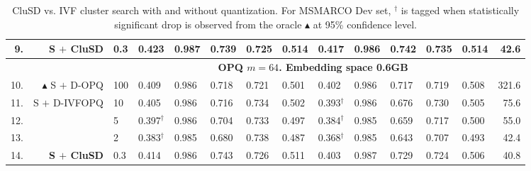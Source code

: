 \begin{table*}[htbp]
{\begin{tabular}{ r r l |l l ll l |llll l|r}
           9. &   \textbf{S $+$ CluSD}  &0.3& 0.423 & 0.987 & 0.739& 0.725 &0.514 & 0.417& 0.986& 0.742&0.735& 0.514  & 42.6  \\
             \hline
           & & & \multicolumn{10}{c}{\bf{OPQ $m=64$. Embedding space 0.6GB}}\\
            \hline
           10. & $\blacktriangle$  S $+$ D-OPQ  &100 & 0.409 & 0.986 & 0.718 &  0.721  &0.501 & 0.402 & 0.986 & 0.717 &  0.719 & 0.508 & 321.6 \\
           11. &   S $+$ D-IVFOPQ &10& 0.405 & 0.986 & 0.716 & 0.734 & 0.502 & 0.393$^\dag$& 0.986& 0.676&0.730& 0.505& 75.6 \\
           12. &   &5& 0.397$^\dag$& 0.986 & 0.704 & 0.733  & 0.497 & 0.384$^\dag$& 0.985& 0.659&0.717& 0.500& 55.0 \\ 
            13. &  &2& 0.383$^\dag$& 0.985 & 0.680 & 0.738 & 0.487 & 0.368$^\dag$& 0.985 & 0.643&0.707& 0.493 & 42.4 \\
            14. &  \textbf{S $+$ CluSD}  &0.3& 0.414 & 0.986 & 0.743& 0.726 & 0.511 & 0.403 & 0.987& 0.729&0.724 & 0.506 & 40.8 \\
              \hline\hline
		\end{tabular}
		}
	\caption{
CluSD vs. IVF cluster search with and without quantization.
For MSMARCO Dev set, $^\dag$ is tagged when statistically significant drop is observed from the oracle $\blacktriangle$ at 95\% confidence level. 
}
\vspace*{-5mm}
	\label{tab:mainspace}
\end{table*}

